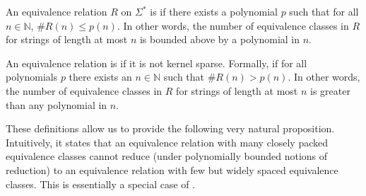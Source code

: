 \begin{definition}
  An equivalence relation $R$ on $\Sigma^*$ is  if there exists a polynomial $p$ such that for all $n\in\mathbb{N}$, $\#R(n)\leq p(n)$.
  In other words, the number of equivalence classes in $R$ for strings of length at most $n$ is bounded above by a polynomial in $n$.

  An equivalence relation is  if it is not kernel sparse.
  Formally, if for all polynomials $p$ there exists an $n\in\mathbb{N}$ such that $\#R(n)>p(n)$.
  In other words, the number of equivalence classes in $R$ for strings of length at most $n$ is greater than any polynomial in $n$.
\end{definition}

These definitions allow us to provide the following very natural proposition.
Intuitively, it states that an equivalence relation with many closely packed equivalence classes cannot reduce (under polynomially bounded notions of reduction) to an equivalence relation with few but widely spaced equivalence classes.
This is essentially a special case of \autocite[Lemma~2.3]{gz14}.

